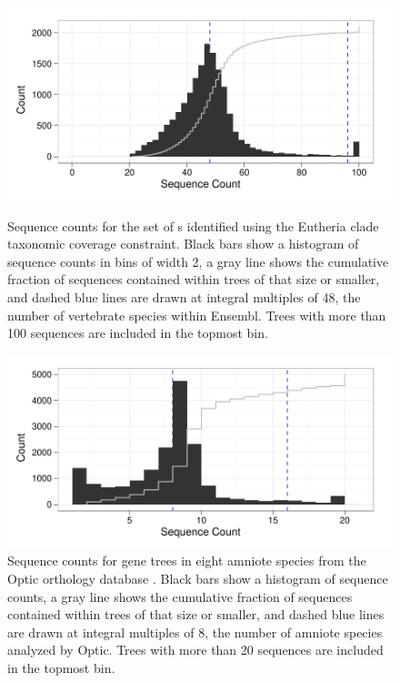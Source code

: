 \begin{figure}[t!]
\centering
\includegraphics[scale=0.8]{Figs/ensembl_euth_hist.pdf}
\caption{Sequence counts for the set of \subtr{}s identified using the
  Eutheria clade taxonomic coverage constraint. Black bars show a
  histogram of sequence counts in bins of width 2, a gray line shows
  the cumulative fraction of sequences contained within trees of that
  size or smaller, and dashed blue lines are drawn at integral
  multiples of 48, the number of vertebrate species within
  Ensembl. Trees with more than 100 sequences are included in the
  topmost bin.}
\label{ensembl_euth_hist}

\hspace{.2in}

\includegraphics[scale=0.8]{Figs/optic_roots_hist.pdf}
\caption{Sequence counts for gene trees in eight amniote species from
  the Optic orthology database \citep{Heger2008}. Black bars show a
  histogram of sequence counts, a gray line shows the cumulative
  fraction of sequences contained within trees of that size or
  smaller, and dashed blue lines are drawn at integral multiples of 8,
  the number of amniote species analyzed by Optic. Trees with more
  than 20 sequences are included in the topmost bin.}
\label{optic_roots_hist}
\end{figure}

